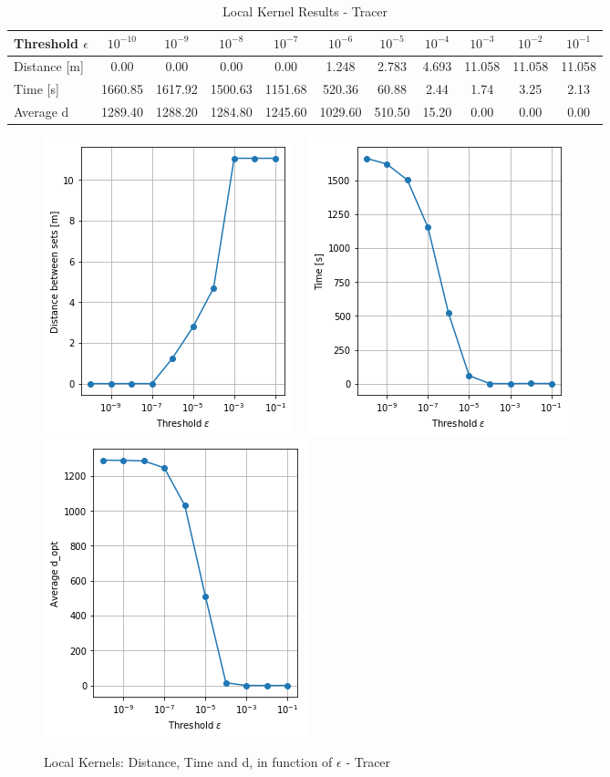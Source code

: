 \begin{table}[h]
\centering
\scriptsize
\begin{tabular}{l|cccccccccc}
  \toprule
  Threshold $\epsilon$ & $10^{-10} $ &  $10^{-9}$ & $10^{-8}$ & $10^{-7}$ & $10^{-6}$ & $10^{-5}$ & $10^{-4}$ & $10^{-3}$ & $10^{-2}$ & $10^{-1}$ \\
    \midrule
  Distance [m]       &    0.00 &    0.00 &    0.00 &    0.00 &   1.248 &  2.783 & 4.693 & 11.058 & 11.058 & 11.058 \\
Time [s]       & 1660.85 & 1617.92 & 1500.63 & 1151.68 &  520.36 &  60.88 &  2.44 &   1.74 &   3.25 &   2.13 \\
Average d & 1289.40 & 1288.20 & 1284.80 & 1245.60 & 1029.60 & 510.50 & 15.20 &   0.00 &   0.00 &   0.00 \\
  \bottomrule
\end{tabular}
\caption{Local Kernel Results - Tracer}
\label{tab:comp:results}
\end{table}

\begin{figure}[h]
\centering
\includegraphics[height=0.33\linewidth]{figures/CompAlg/3rd/non_centered_60.35.0/comp_dist}
~
\includegraphics[height=0.33\linewidth]{figures/CompAlg/3rd/non_centered_60.35.0/comp_Time}
~
\includegraphics[height=0.33\linewidth]{figures/CompAlg/3rd/non_centered_60.35.0/comp_d_opt}
\caption{Local Kernels: Distance, Time and d, in function of $\epsilon$ - Tracer}
\label{fig:comp:results}
\end{figure}

